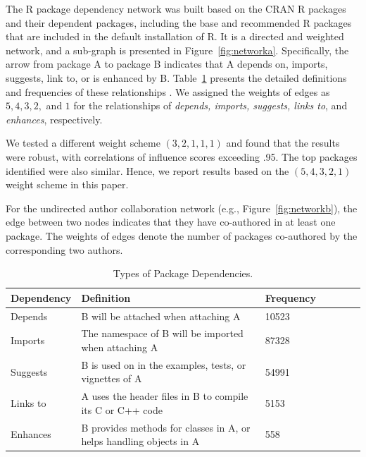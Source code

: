 The R package dependency network was built based on the CRAN R packages and their dependent packages, including the base and recommended R packages that are included in the default installation of R. It is a directed and weighted network, and a sub-graph is presented in Figure~\ref{fig:networka}. Specifically, the arrow from package A to package B indicates that A depends on, imports, suggests, link to, or is enhanced by B. Table~\ref{tab:connections} presents the detailed definitions and frequencies of these relationships \citep{R}. We assigned the weights of edges as $5, 4, 3, 2,$ and $1$ for the relationships of {\it depends, imports, suggests, links to}, and {\it enhances}, respectively.

We tested a different weight scheme $(3, 2, 1, 1, 1)$ and found that the results were robust, with correlations of influence scores exceeding .95. The top packages identified were also similar. Hence, we report results based on the $(5, 4, 3, 2, 1)$ weight scheme in this paper.

For the undirected author collaboration network (e.g., Figure~\ref{fig:networkb}), the edge between two nodes indicates that they have co-authored in at least one package. The weights of edges denote the number of packages co-authored by the corresponding two authors.




\begin{table}[h]
\tabcolsep 2pt \caption{Types of Package Dependencies.} \vspace{0.0in}
\begin{center} \label{tab:connections}
\begin{tabular}{lllllll}
\toprule
Dependency & Definition & Frequency\\
 \midrule
Depends & B will be attached when attaching A  & 10523 \\
Imports & The namespace of B will be imported when attaching A & 87328\\ %
Suggests & B is used on in the examples, tests, or vignettes of A & 54991\\
Links to & A uses the header files in B to compile its C or C++ code & 5153\\
Enhances & B provides methods for classes in A, or helps handling objects in A & 558\\
\bottomrule
\end{tabular}
\end{center}
\end{table}



